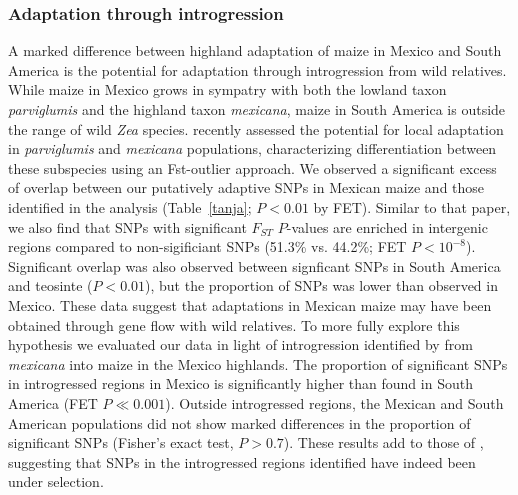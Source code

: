 {{{%

\subsubsection{Adaptation through introgression}

A marked difference between highland adaptation of maize in Mexico and South America is the potential for adaptation through introgression from wild relatives.  While maize in Mexico grows in sympatry with both the lowland taxon \textit{parviglumis} and the highland taxon \textit{mexicana}, maize in South America is outside the range of wild \textit{Zea} species.
 \citep{Pyhajarvi2013} recently assessed the potential for local adaptation in \textit{parviglumis} and \textit{mexicana} populations, characterizing differentiation between these subspecies using an Fst-outlier approach.
We observed a significant excess of overlap between our putatively adaptive SNPs in Mexican maize and those identified in the \citep{Pyhajarvi2013} analysis (Table~\ref{tanja}; $P<0.01$ by FET). Similar to that paper, we also find that SNPs with significant $F_{ST}$ $P$-values are enriched in intergenic regions compared to non-sigificiant SNPs (51.3\% vs. 44.2\%; FET $P < 10^{-8}$). Significant overlap was also observed between signficant SNPs in South America and teosinte ($P<0.01$), but the proportion of SNPs was lower than observed in Mexico.  These data suggest that adaptations in Mexican maize may have been obtained through gene flow with wild relatives.  To more fully explore this hypothesis we evaluated our data in light of introgression identified by \citep{Profford_2013} from \textit{mexicana} into maize in the Mexico highlands.  
The proportion of significant SNPs in introgressed regions in Mexico is significantly higher than found in South America (FET $P\ll0.001$).
Outside introgressed regions, the Mexican and South American populations did not show marked differences in the proportion of significant SNPs (Fisher's exact test, $P>0.7$). These results add to those of \citep{Profford_2013}, suggesting that SNPs in the introgressed regions identified have indeed been under selection.  

}}}
